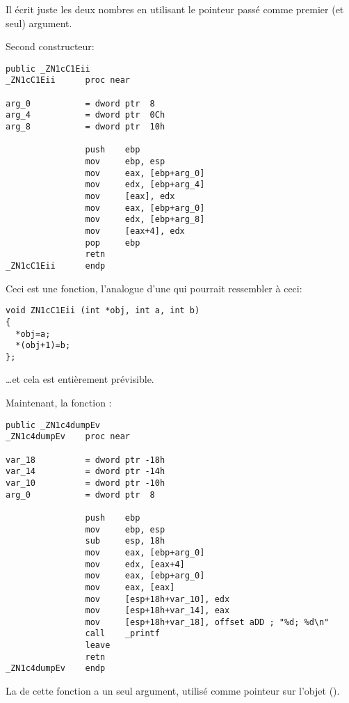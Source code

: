 Il écrit juste les deux nombres en utilisant le pointeur passé comme premier (et
seul) argument.

Second constructeur:

\begin{lstlisting}[style=customasmx86]
                public _ZN1cC1Eii
_ZN1cC1Eii      proc near

arg_0           = dword ptr  8
arg_4           = dword ptr  0Ch
arg_8           = dword ptr  10h

                push    ebp
                mov     ebp, esp
                mov     eax, [ebp+arg_0]
                mov     edx, [ebp+arg_4]
                mov     [eax], edx
                mov     eax, [ebp+arg_0]
                mov     edx, [ebp+arg_8]
                mov     [eax+4], edx
                pop     ebp
                retn
_ZN1cC1Eii      endp
\end{lstlisting}

Ceci est une fonction, l'analogue d'une qui pourrait ressembler à ceci:

\begin{lstlisting}[style=customc]
void ZN1cC1Eii (int *obj, int a, int b)
{
  *obj=a;
  *(obj+1)=b;
};
\end{lstlisting}

\dots et cela est entièrement prévisible.

Maintenant, la fonction :

\begin{lstlisting}[style=customasmx86]
                public _ZN1c4dumpEv
_ZN1c4dumpEv    proc near

var_18          = dword ptr -18h
var_14          = dword ptr -14h
var_10          = dword ptr -10h
arg_0           = dword ptr  8

                push    ebp
                mov     ebp, esp
                sub     esp, 18h
                mov     eax, [ebp+arg_0]
                mov     edx, [eax+4]
                mov     eax, [ebp+arg_0]
                mov     eax, [eax]
                mov     [esp+18h+var_10], edx
                mov     [esp+18h+var_14], eax
                mov     [esp+18h+var_18], offset aDD ; "%d; %d\n"
                call    _printf
                leave
                retn
_ZN1c4dumpEv    endp
\end{lstlisting}

La  de cette fonction a un seul argument, utilisé comme
pointeur sur l'objet (\ITthis).

